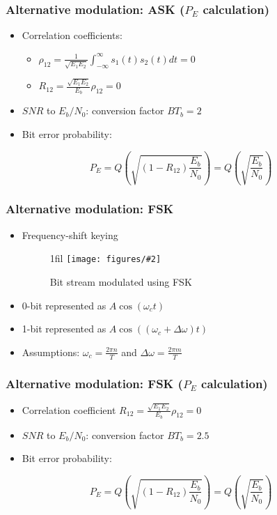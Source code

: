 \documentclass{beamer}
\makeatletter
\newcommand*{\centerfloat}{%
  \parindent \z@
  \leftskip \z@ \@plus 1fil \@minus \textwidth
  \rightskip\leftskip
  \parfillskip \z@skip}
\newcommand{\fig}[3]{
  \begin{figure}[H]
  \centerfloat
    \texttt{[image: figures/\#2]}
	\caption{#3}
  \end{figure}
}
\makeatother
\begin{document}
\begin{frame}
	\frametitle{Alternative modulation: ASK ($P_E$ calculation)}
	\begin{itemize}
		\item Correlation coefficients:
		\begin{itemize}
			\item $\rho_{12} = \frac{1}{\sqrt{E_1 E_2}} \int_{-\infty}^{\infty} s_1(t) s_2(t) dt = 0$
			\item $R_{12} = \frac{\sqrt{E_1 E_2}}{E_b}\rho_{12} = 0$
		\end{itemize}
		\item $SNR$ to $E_b/N_0$: conversion factor $B T_b = 2$
		\item Bit error probability:
	\end{itemize}
	\begin{equation}
		P_E = Q\left(\sqrt{\left(1 - R_{12}\right) \frac{E_b}{N_0}}\right) = Q\left(\sqrt{\frac{E_b}{N_0}}\right)
	\end{equation}
\end{frame}

\begin{frame}
	\frametitle{Alternative modulation: FSK}
	\begin{itemize}
		\item Frequency-shift keying
		\fig{2.5cm}{fsk.png}{Bit stream modulated using FSK}
		\item 0-bit represented as $A\cos(\omega_c t)$
		\item 1-bit represented as $A\cos((\omega_c + \Delta \omega) t)$
		\item Assumptions: $\omega_c = \frac{2 \pi n}{T}$ and $\Delta\omega = \frac{2 \pi m}{T}$
	\end{itemize}
\end{frame}

\begin{frame}
	\frametitle{Alternative modulation: FSK ($P_E$ calculation)}
	\begin{itemize}
		\item Correlation coefficient $R_{12} = \frac{\sqrt{E_1 E_2}}{E_b}\rho_{12} = 0$
		\item $SNR$ to $E_b/N_0$: conversion factor $B T_b = 2.5$
		\item Bit error probability:
	\end{itemize}
	\begin{equation}
		P_E = Q\left(\sqrt{\left(1 - R_{12}\right) \frac{E_b}{N_0}}\right) = Q\left(\sqrt{\frac{E_b}{N_0}}\right)
	\end{equation}
\end{frame}
\end{document}
